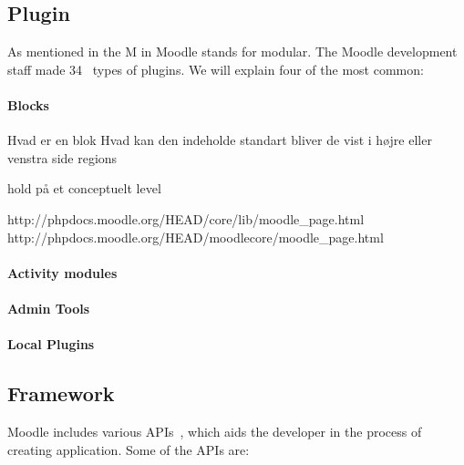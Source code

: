 \subsection{Plugin}

As mentioned in  the M in Moodle stands for modular. 
The Moodle development staff made 34~\cite{plugins} types of plugins.
We will explain four of the most common: 





\paragraph{Blocks}
\label{subsec:blocks}

Hvad er en blok
Hvad kan den indeholde
standart bliver de vist i højre eller venstra side
regions

hold på et conceptuelt level

http://phpdocs.moodle.org/HEAD/core/lib/moodle_page.html
http://phpdocs.moodle.org/HEAD/moodlecore/moodle_page.html





\paragraph{Activity modules}


\paragraph{Admin Tools}





\paragraph{Local Plugins}



\subsection{Framework}
Moodle includes various APIs~\cite{moodlecoreapis}, which aids the developer in the process of creating application. Some of the APIs are:

